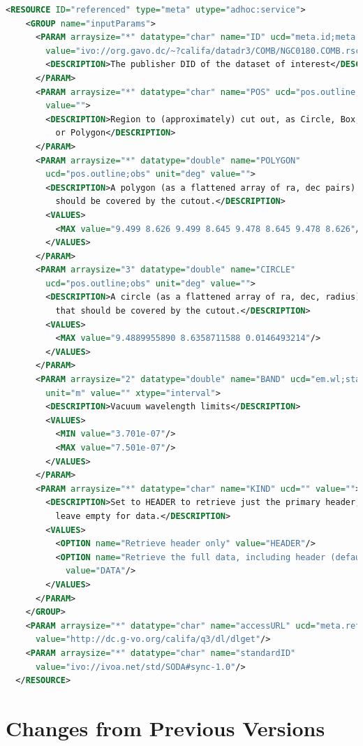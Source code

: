 \documentclass[11pt,a4paper]{ivoa}
\begin{document}
\begin{lstlisting}[language=XML,basicstyle=\footnotesize]
  <RESOURCE ID="referenced" type="meta" utype="adhoc:service">
    <GROUP name="inputParams">
      <PARAM arraysize="*" datatype="char" name="ID" ucd="meta.id;meta.main" 
        value="ivo://org.gavo.dc/~?califa/datadr3/COMB/NGC0180.COMB.rscube.fits">
        <DESCRIPTION>The publisher DID of the dataset of interest</DESCRIPTION>
      </PARAM>
      <PARAM arraysize="*" datatype="char" name="POS" ucd="pos.outline;obs" 
        value="">
        <DESCRIPTION>Region to (approximately) cut out, as Circle, Box, 
          or Polygon</DESCRIPTION>
      </PARAM>
      <PARAM arraysize="*" datatype="double" name="POLYGON" 
        ucd="pos.outline;obs" unit="deg" value="">
        <DESCRIPTION>A polygon (as a flattened array of ra, dec pairs) that 
          should be covered by the cutout.</DESCRIPTION>
        <VALUES>
          <MAX value="9.499 8.626 9.499 8.645 9.478 8.645 9.478 8.626"/>
        </VALUES>
      </PARAM>
      <PARAM arraysize="3" datatype="double" name="CIRCLE" 
        ucd="pos.outline;obs" unit="deg" value="">
        <DESCRIPTION>A circle (as a flattened array of ra, dec, radius) 
          that should be covered by the cutout.</DESCRIPTION>
        <VALUES>
          <MAX value="9.4889955890 8.6358711588 0.0146493214"/>
        </VALUES>
      </PARAM>
      <PARAM arraysize="2" datatype="double" name="BAND" ucd="em.wl;stat.interval" 
        unit="m" value="" xtype="interval">
        <DESCRIPTION>Vacuum wavelength limits</DESCRIPTION>
        <VALUES>
          <MIN value="3.701e-07"/>
          <MAX value="7.501e-07"/>
        </VALUES>
      </PARAM>
      <PARAM arraysize="*" datatype="char" name="KIND" ucd="" value="">
        <DESCRIPTION>Set to HEADER to retrieve just the primary header, 
          leave empty for data.</DESCRIPTION>
        <VALUES>
          <OPTION name="Retrieve header only" value="HEADER"/>
          <OPTION name="Retrieve the full data, including header (default)" 
            value="DATA"/>
        </VALUES>
      </PARAM>
    </GROUP>
    <PARAM arraysize="*" datatype="char" name="accessURL" ucd="meta.ref.url" 
      value="http://dc.g-vo.org/califa/q3/dl/dlget"/>
    <PARAM arraysize="*" datatype="char" name="standardID" 
      value="ivo://ivoa.net/std/SODA#sync-1.0"/>
  </RESOURCE>
\end{lstlisting}


\section{Changes from Previous Versions}
\end{document}
